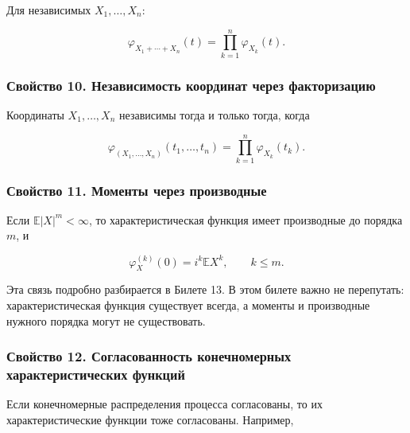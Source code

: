 \documentclass[
  11pt,
  a4paper,
]{article}
\begin{document}
Для независимых \(X_1,\ldots,X_n\):

\[
\varphi_{X_1+\cdots+X_n}(t)=\prod_{k=1}^n\varphi_{X_k}(t).
\]

\subsubsection{Свойство 10. Независимость координат через
факторизацию}\label{ux441ux432ux43eux439ux441ux442ux432ux43e-10.-ux43dux435ux437ux430ux432ux438ux441ux438ux43cux43eux441ux442ux44c-ux43aux43eux43eux440ux434ux438ux43dux430ux442-ux447ux435ux440ux435ux437-ux444ux430ux43aux442ux43eux440ux438ux437ux430ux446ux438ux44e}

Координаты \(X_1,\ldots,X_n\) независимы тогда и только тогда, когда

\[
\varphi_{(X_1,\ldots,X_n)}(t_1,\ldots,t_n)
=
\prod_{k=1}^n\varphi_{X_k}(t_k).
\]

\subsubsection{Свойство 11. Моменты через
производные}\label{ux441ux432ux43eux439ux441ux442ux432ux43e-11.-ux43cux43eux43cux435ux43dux442ux44b-ux447ux435ux440ux435ux437-ux43fux440ux43eux438ux437ux432ux43eux434ux43dux44bux435}

Если \(\mathbb E|X|^m<\infty\), то характеристическая функция имеет
производные до порядка \(m\), и

\[
\varphi_X^{(k)}(0)=i^k\mathbb E X^k,
\qquad k\le m.
\]

Эта связь подробно разбирается в Билете 13. В этом билете важно не
перепутать: характеристическая функция существует всегда, а моменты и
производные нужного порядка могут не существовать.

\subsubsection{Свойство 12. Согласованность конечномерных
характеристических
функций}\label{ux441ux432ux43eux439ux441ux442ux432ux43e-12.-ux441ux43eux433ux43bux430ux441ux43eux432ux430ux43dux43dux43eux441ux442ux44c-ux43aux43eux43dux435ux447ux43dux43eux43cux435ux440ux43dux44bux445-ux445ux430ux440ux430ux43aux442ux435ux440ux438ux441ux442ux438ux447ux435ux441ux43aux438ux445-ux444ux443ux43dux43aux446ux438ux439}

Если конечномерные распределения процесса согласованы, то их
характеристические функции тоже согласованы. Например,
\end{document}

